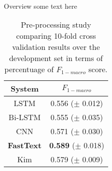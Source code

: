 \begin{comment}
\begin{table}[h]
\footnotesize
\caption{Text representation study comparing 10-fold cross validation results over the development set in terms of percentuage of $F_{1-macro}$ score. The pre-processing setting was fixed at RM+EM.}
\centering
\begin{tabular}{l|ccccc}
\toprule
\multirow{2}{*}{Embedding}	& \multicolumn{5}{ c }{Models}       \\ 
					& CNN		& LSTM		& B-LSTM	& FAST-TEXT	& KIM	\\ 
\hline 
ES static			& \textbf{48,1}		& 36,1		& 38,9		& 36,4		& 43,6\\
CA static			& \textbf{45,1}		& 30,6		& 38,5		& 30,1		& 39,6\\ 
\hline
ES non-static		& \win57,1		& 52,1		& 49,9		& \win54,8		& \win\textbf{58,9}\\
CA non-static		& 53,5		& \win53,6		& 46,3		& 54,1		& \textbf{56,2}\\
\hline
non-static			& 52,6		& 47,3		& \win51,8		& 53,3		& \textbf{54,7}\\
\bottomrule
\end{tabular}
\end{table}
\end{comment}

Overview some text here

\begin{table}[h]
\footnotesize
\caption{Pre-processing study comparing 10-fold cross validation results over the development set in terms of percentuage of $F_{1-macro}$ score. }
\label{tab:overview}
\centering
\begin{tabular}{c|c}
\toprule
\hline
System		& $F_{1-macro}$		\\
\hline
LSTM		& 0.556 ($\pm$ 0.012) \\
Bi-LSTM		& 0.555 ($\pm$ 0.035) \\
CNN			& 0.571 ($\pm$ 0.030) \\
\textbf{FastText}	& \textbf{0.589} ($\pm$ 0.018) \\
Kim			& 0.579 ($\pm$ 0.009) \\
\hline
\bottomrule
\end{tabular}
\end{table}
